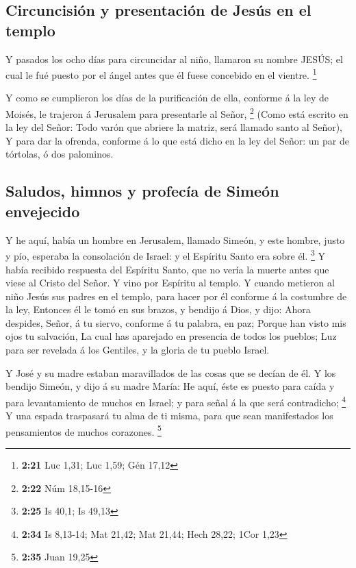 \hypertarget{circuncisiuxf3n-y-presentaciuxf3n-de-jesuxfas-en-el-templo}{%
\subsection{Circuncisión y presentación de Jesús en el
templo}\label{circuncisiuxf3n-y-presentaciuxf3n-de-jesuxfas-en-el-templo}}

 Y pasados los ocho días para circuncidar al niño,
llamaron su nombre JESÚS; el cual le fué puesto por el ángel antes que
él fuese concebido en el vientre. \footnote{\textbf{2:21} Luc 1,31; Luc
  1,59; Gén 17,12}

 Y como se cumplieron los días de la purificación de
ella, conforme á la ley de Moisés, le trajeron á Jerusalem para
presentarle al Señor, \footnote{\textbf{2:22} Núm 18,15-16}
 (Como está escrito en la ley del Señor: Todo varón que
abriere la matriz, será llamado santo al Señor),  Y para
dar la ofrenda, conforme á lo que está dicho en la ley del Señor: un par
de tórtolas, ó dos palominos.

\hypertarget{saludos-himnos-y-profecuxeda-de-simeuxf3n-envejecido}{%
\subsection{Saludos, himnos y profecía de Simeón
envejecido}\label{saludos-himnos-y-profecuxeda-de-simeuxf3n-envejecido}}

 Y he aquí, había un hombre en Jerusalem, llamado Simeón,
y este hombre, justo y pío, esperaba la consolación de Israel: y el
Espíritu Santo era sobre él. \footnote{\textbf{2:25} Is 40,1; Is 49,13}
 Y había recibido respuesta del Espíritu Santo, que no
vería la muerte antes que viese al Cristo del Señor.  Y
vino por Espíritu al templo. Y cuando metieron al niño Jesús sus padres
en el templo, para hacer por él conforme á la costumbre de la ley,
 Entonces él le tomó en sus brazos, y bendijo á Dios, y
dijo:  Ahora despides, Señor, á tu siervo, conforme á tu
palabra, en paz;  Porque han visto mis ojos tu salvación,
 La cual has aparejado en presencia de todos los pueblos;
 Luz para ser revelada á los Gentiles, y la gloria de tu
pueblo Israel.

 Y José y su madre estaban maravillados de las cosas que
se decían de él.  Y los bendijo Simeón, y dijo á su madre
María: He aquí, éste es puesto para caída y para levantamiento de muchos
en Israel; y para señal á la que será contradicho; \footnote{\textbf{2:34}
  Is 8,13-14; Mat 21,42; Mat 21,44; Hech 28,22; 1Cor 1,23}
 Y una espada traspasará tu alma de ti misma, para que
sean manifestados los pensamientos de muchos corazones. \footnote{\textbf{2:35}
  Juan 19,25}

